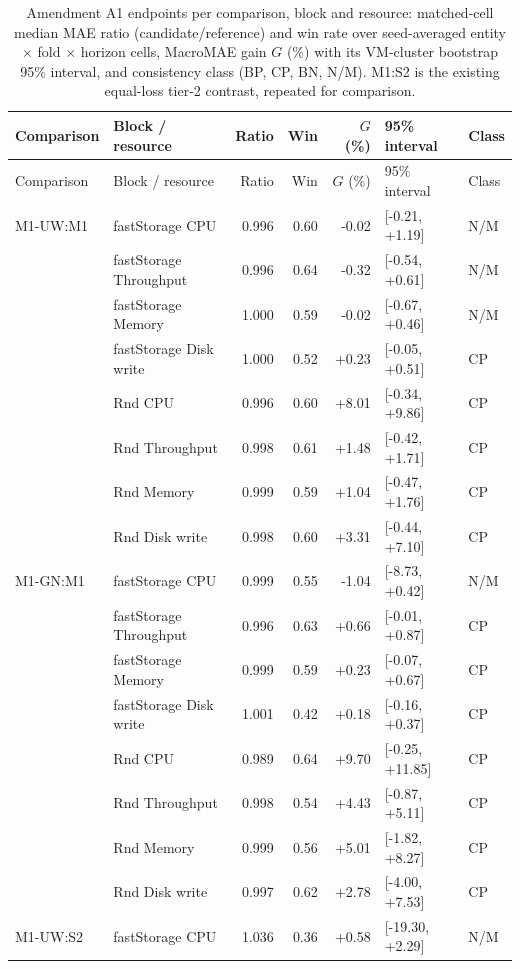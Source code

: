 \begin{longtable}{@{}llrrrll@{}}
\caption{Amendment A1 endpoints per comparison, block and resource: matched-cell median MAE ratio (candidate/reference) and win rate over seed-averaged entity $\times$ fold $\times$ horizon cells, MacroMAE gain $G$ (\%) with its VM-cluster bootstrap 95\% interval, and consistency class (BP, CP, BN, N/M). M1:S2 is the existing equal-loss tier-2 contrast, repeated for comparison.}\label{tab:a1-endpoints}\\
\toprule
Comparison & Block / resource & Ratio & Win & $G$ (\%) & 95\% interval & Class \\
\midrule
\endfirsthead
\toprule
Comparison & Block / resource & Ratio & Win & $G$ (\%) & 95\% interval & Class \\
\midrule
\endhead
M1-UW:M1 & fastStorage CPU & 0.996 & 0.60 & -0.02 & [-0.21, +1.19] & N/M \\
 & fastStorage Throughput & 0.996 & 0.64 & -0.32 & [-0.54, +0.61] & N/M \\
 & fastStorage Memory & 1.000 & 0.59 & -0.02 & [-0.67, +0.46] & N/M \\
 & fastStorage Disk write & 1.000 & 0.52 & +0.23 & [-0.05, +0.51] & CP \\
 & Rnd CPU & 0.996 & 0.60 & +8.01 & [-0.34, +9.86] & CP \\
 & Rnd Throughput & 0.998 & 0.61 & +1.48 & [-0.42, +1.71] & CP \\
 & Rnd Memory & 0.999 & 0.59 & +1.04 & [-0.47, +1.76] & CP \\
 & Rnd Disk write & 0.998 & 0.60 & +3.31 & [-0.44, +7.10] & CP \\
\addlinespace
M1-GN:M1 & fastStorage CPU & 0.999 & 0.55 & -1.04 & [-8.73, +0.42] & N/M \\
 & fastStorage Throughput & 0.996 & 0.63 & +0.66 & [-0.01, +0.87] & CP \\
 & fastStorage Memory & 0.999 & 0.59 & +0.23 & [-0.07, +0.67] & CP \\
 & fastStorage Disk write & 1.001 & 0.42 & +0.18 & [-0.16, +0.37] & CP \\
 & Rnd CPU & 0.989 & 0.64 & +9.70 & [-0.25, +11.85] & CP \\
 & Rnd Throughput & 0.998 & 0.54 & +4.43 & [-0.87, +5.11] & CP \\
 & Rnd Memory & 0.999 & 0.56 & +5.01 & [-1.82, +8.27] & CP \\
 & Rnd Disk write & 0.997 & 0.62 & +2.78 & [-4.00, +7.53] & CP \\
\addlinespace
M1-UW:S2 & fastStorage CPU & 1.036 & 0.36 & +0.58 & [-19.30, +2.29] & N/M \\

\end{longtable}
